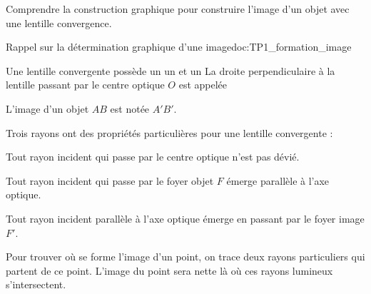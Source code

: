 \teteSndLumi

\vspace*{-30pt}


\begin{objectifs}
  \item Comprendre la construction graphique pour construire l'image d'un objet avec une lentille convergence.
\end{objectifs}


\begin{doc}{Rappel sur la détermination graphique d'une image}{doc:TP1_formation_image}
  \begin{encart}
    Une lentille convergente possède un  un et un 
    La droite perpendiculaire à la lentille passant par le centre optique $O$ est appelée 
  \end{encart}
  L'image d'un objet $AB$ est notée $A'B'$.
  
  \begin{center}
  \end{center}
  
  \begin{encart}
    Trois rayons ont des propriétés particulières pour une lentille convergente :
  \begin{listePoints}
    \item Tout rayon incident qui passe par le centre optique n'est pas dévié.
    \item Tout rayon incident qui passe par le foyer objet $F$ émerge parallèle à l'axe optique.
    \item Tout rayon incident parallèle à l'axe optique émerge en passant par le foyer image $F'$.
  \end{listePoints}
  \end{encart}
  Pour trouver où se forme l'image d'un point, on trace deux rayons particuliers qui partent de ce point. 
  L'image du point sera nette là où ces rayons lumineux s'intersectent.
\end{doc}

